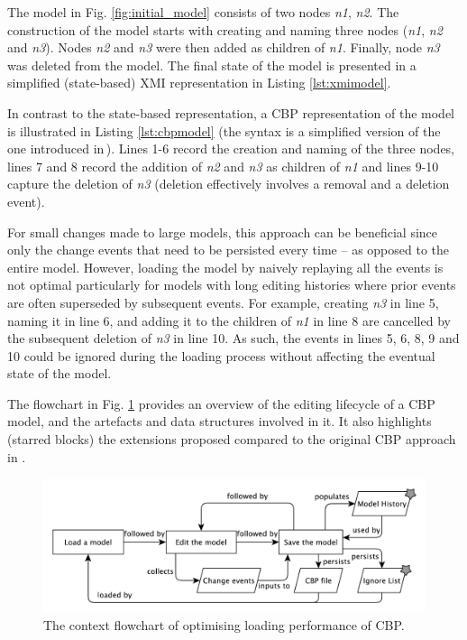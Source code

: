 \documentclass[12pt, a4paper]{report} \usepackage[titletoc]{appendix}
\begin{document}
The model in Fig. \ref{fig:initial_model} consists of two nodes \emph{n1}, \emph{n2}.
The construction of the model starts with creating and naming three nodes (\emph{n1}, \emph{n2} and \emph{n3}).
Nodes \emph{n2} and \emph{n3} were then added as children of \emph{n1}.
Finally, node \emph{n3} was deleted from the model.
The final state of the model is presented in a simplified (state-based) XMI representation in Listing \ref{lst:xmimodel}.

In contrast to the state-based representation, a CBP representation of the model is illustrated in Listing \ref{lst:cbpmodel} (the syntax is a simplified version of the one introduced in\,\cite{yohannis2017turning}). Lines 1-6 record the creation and naming of the three nodes, lines 7 and 8 record the addition of \emph{n2} and \emph{n3} as children of \emph{n1} and lines 9-10 capture the deletion of \emph{n3} (deletion effectively involves a removal and a deletion event).

For small changes made to large models, this approach can be beneficial since only the change events that need to be persisted every time -- as opposed to the entire model. However, loading the model by naively replaying all the events is not optimal particularly for models with long editing histories where prior events are often superseded by subsequent events. For example, creating \emph{n3} in line 5, naming it in line 6, and adding it to the children of \emph{n1} in line 8 are cancelled by the subsequent deletion of \emph{n3} in line 10. As such, the events in lines 5, 6, 8, 9 and 10 could be ignored during the loading process without affecting the eventual state of the model.

The flowchart in Fig. \ref{fig:flowchart} provides an overview of the editing lifecycle of a CBP model, and the artefacts and data structures involved in it. It also highlights (starred blocks) the extensions proposed compared to the original CBP approach in \cite{yohannis2017turning}.

\begin{figure}[ht]
    \centering
    \includegraphics[width=\linewidth]{flowchart}
    \caption{The context flowchart of optimising loading performance of CBP.}
    \label{fig:flowchart}
\end{figure}
\end{document}
